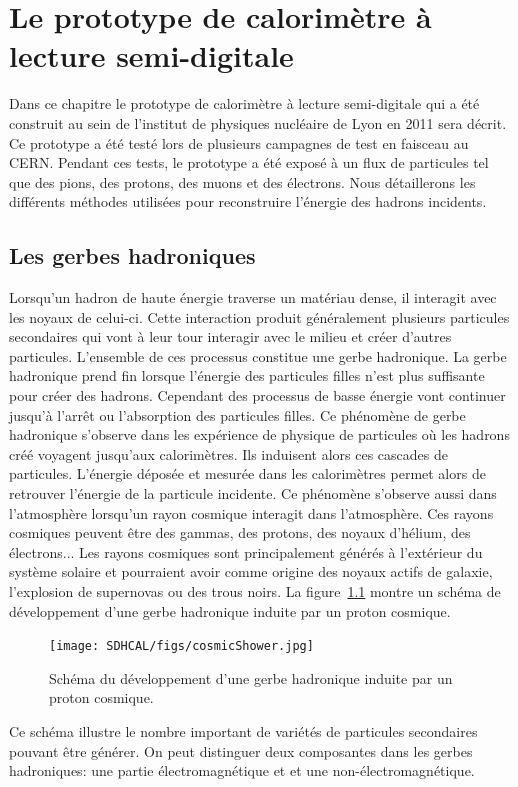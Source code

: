 \chapter{Le prototype de calorimètre à lecture semi-digitale}
\label{chap.sdhcal}
Dans ce chapitre le prototype de calorimètre à lecture semi-digitale qui a été construit au sein de l’institut de physiques nucléaire de Lyon en 2011 sera décrit. Ce prototype a été testé lors de plusieurs campagnes de test en faisceau au CERN. Pendant ces tests, le prototype a été exposé à un flux de particules tel que des pions, des protons, des muons et des électrons. Nous détaillerons les différents méthodes utilisées pour reconstruire l’énergie des hadrons incidents. 
\minitoc
\newpage


\section{Les gerbes hadroniques}
Lorsqu'un hadron de haute énergie traverse un matériau dense, il interagit avec les noyaux de celui-ci. Cette interaction produit généralement plusieurs particules secondaires qui vont à leur tour interagir avec le milieu et créer d'autres particules. L'ensemble de ces processus constitue une gerbe hadronique.  La gerbe hadronique prend fin lorsque l'énergie des particules filles n'est plus suffisante pour créer des hadrons. Cependant des processus de basse énergie vont continuer jusqu'à l'arrêt ou l'absorption des particules filles. Ce phénomène de gerbe hadronique s'observe dans les expérience de physique de particules où les hadrons créé voyagent jusqu'aux calorimètres. Ils induisent alors ces cascades de particules. L'énergie déposée et mesurée dans les calorimètres permet alors de retrouver l'énergie de la particule incidente. Ce phénomène s'observe aussi dans l'atmosphère lorsqu'un rayon cosmique interagit dans l'atmosphère. Ces rayons cosmiques peuvent être des gammas, des protons, des noyaux d'hélium, des électrons... Les rayons cosmiques sont principalement générés à l'extérieur du système solaire et pourraient avoir comme origine des noyaux actifs de galaxie, l'explosion de supernovas ou des trous noirs. La figure~\ref{fig:cosmicShowerScheme} montre un schéma de développement d'une gerbe hadronique induite par un proton cosmique.
\begin{figure}[!h]
  \begin{center}
    \texttt{[image: SDHCAL/figs/cosmicShower.jpg]}
    \caption{Schéma du développement d'une gerbe hadronique induite par un proton cosmique.}
    \label{fig:cosmicShowerScheme}
  \end{center}
\end{figure}
Ce schéma illustre le nombre important de variétés de particules secondaires pouvant être générer. On peut distinguer deux composantes dans les gerbes hadroniques: une partie électromagnétique et et une non-électromagnétique.\\


